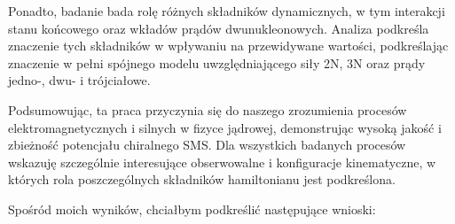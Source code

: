 \documentclass[a4paper, 14pt]{extarticle}
\begin{document}
Ponadto, badanie bada rol\k{e} r\'o\.znych sk\l{}adnik\'ow dynamicznych, w tym interakcji stanu końcowego oraz wk\l{}ad\'ow pr\k{a}d\'ow dwunukleonowych. Analiza podkreśla znaczenie tych sk\l{}adnik\'ow w wp\l{}ywaniu na przewidywane wartości, podkreślaj\k{a}c znaczenie w pe\l{}ni sp\'ojnego modelu uwzgl\k{e}dniaj\k{a}cego si\l{}y 2N, 3N oraz pr\k{a}dy jedno-, dwu- i tr\'ojcia\l{}owe.

Podsumowuj\k{a}c, ta praca przyczynia si\k{e} do naszego zrozumienia proces\'ow elektromagnetycznych i silnych w fizyce j\k{a}drowej, demonstruj\k{a}c wysok\k{a} jakoś\'c i zbie\.znoś\'c potencja\l{}u chiralnego SMS.
Dla wszystkich badanych proces\'ow wskazuj\k{e} szczeg\'olnie interesuj\k{a}ce obserwowalne i konfiguracje kinematyczne, w kt\'orych rola poszczeg\'olnych sk\l{}adnik\'ow hamiltonianu jest podkreślona.

Spośr\'od moich wynik\'ow, chcia\l{}bym podkreśli\'c nast\k{e}puj\k{a}ce wnioski:
\end{document}
